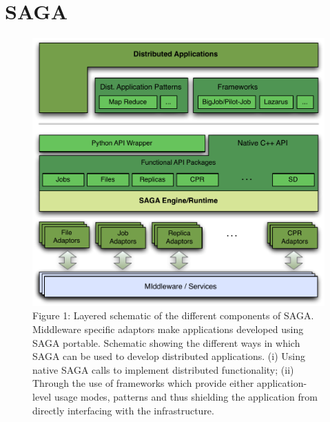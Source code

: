 \section {SAGA}

\begin{figure}
  \includegraphics[width=1.0\textwidth]{./figures/figure_02}
  \caption{\footnotesize Figure 1: Layered schematic of the different
    components of SAGA.  Middleware specific adaptors make
    applications developed using SAGA portable.  Schematic showing the
    different ways in which SAGA can be used to develop distributed
    applications. (i) Using native SAGA calls to implement distributed
    functionality; (ii) Through the use of frameworks which provide
    either application-level usage modes, patterns and thus shielding
    the application from directly interfacing with the
    infrastructure.}
 \label{sagalayer}
\end{figure}
	
	
